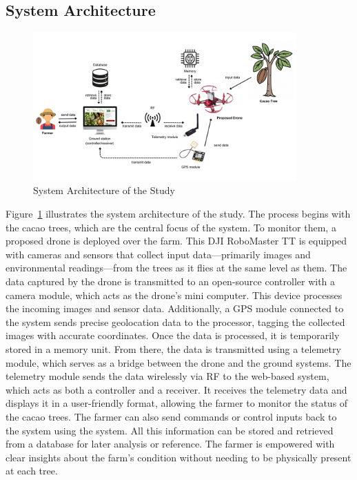 \subsection{System Architecture}

\begin{figure}[H]
	\centering
	\caption{System Architecture of the Study}
	\label{fig:SysArch}
	\includegraphics[width=0.9\textwidth]{figures/Sys_Arch.pdf}
\end{figure}

Figure~\ref{fig:SysArch} illustrates the system architecture of the study. The process begins with the cacao trees, which are the central focus of the system. To monitor them, a proposed drone is deployed over the farm. This DJI RoboMaster TT is equipped with cameras and sensors that collect input data—primarily images and environmental readings—from the trees as it flies at the same level as them. The data captured by the drone is transmitted to an open-source controller with a camera module, which acts as the drone’s mini computer. This device processes the incoming images and sensor data. Additionally, a GPS module connected to the system sends precise geolocation data to the processor, tagging the collected images with accurate coordinates. Once the data is processed, it is temporarily stored in a memory unit. From there, the data is transmitted using a telemetry module, which serves as a bridge between the drone and the ground systems. The telemetry module sends the data wirelessly via RF to the web-based system, which acts as both a controller and a receiver. It receives the telemetry data and displays it in a user-friendly format, allowing the farmer to monitor the status of the cacao trees. The farmer can also send commands or control inputs back to the system using the system. All this information can be stored and retrieved from a database for later analysis or reference. The farmer is empowered with clear insights about the farm’s condition without needing to be physically present at each tree.

